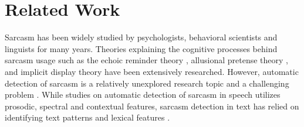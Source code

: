\section{Related Work}
\label{sec:related}
Sarcasm has been widely studied by psychologists, behavioral scientists and linguists for many years. Theories explaining the cognitive processes behind sarcasm usage such as the echoic reminder theory \cite{kreuz89}, allusional pretense theory \cite{kumon95}, and implicit display theory \cite{utsumi77} have been extensively researched. However, automatic detection of sarcasm is a relatively unexplored research topic and a challenging problem \cite{Pang2008}. While studies on automatic detection of sarcasm in speech \cite{tepper06} utilizes prosodic, spectral and contextual features, sarcasm detection in text has relied on identifying text patterns \cite{davidov10} and lexical features \cite{tomas14,Kreuz07}.\\

